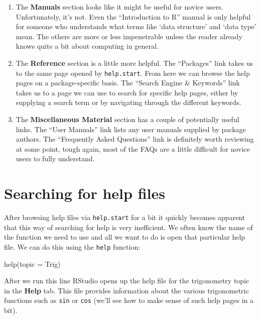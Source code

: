 \documentclass[
]{book}
\newenvironment{Shaded}{\begin{snugshade}}{\end{snugshade}}
\newcommand{\AttributeTok}[1]{\textcolor[rgb]{0.77,0.63,0.00}{#1}}
\newcommand{\FunctionTok}[1]{\textcolor[rgb]{0.00,0.00,0.00}{#1}}
\newcommand{\NormalTok}[1]{#1}
\begin{document}
\begin{enumerate}
\def\labelenumi{\arabic{enumi}.}
\item
  The \textbf{Manuals} section looks like it might be useful for novice users. Unfortunately, it's not. Even the ``Introduction to R'' manual is only helpful for someone who understands what terms like `data structure' and `data type' mean. The others are more or less impenetrable unless the reader already knows quite a bit about computing in general.
\item
  The \textbf{Reference} section is a little more helpful. The ``Packages'' link takes us to the same page opened by \texttt{help.start}. From here we can browse the help pages on a package-specific basis. The ``Search Engine \& Keywords'' link takes us to a page we can use to search for specific help pages, either by supplying a search term or by navigating through the different keywords.
\item
  The \textbf{Miscellaneous Material} section has a couple of potentially useful links. The ``User Manuals'' link lists any user manuals supplied by package authors. The ``Frequently Asked Questions'' link is definitely worth reviewing at some point, tough again, most of the FAQs are a little difficult for novice users to fully understand.
\end{enumerate}

\hypertarget{searching-for-help-files}{%
\section{Searching for help files}\label{searching-for-help-files}}

After browsing help files via \texttt{help.start} for a bit it quickly becomes apparent that this way of searching for help is very inefficient. We often know the name of the function we need to use and all we want to do is open that particular help file. We can do this using the \texttt{help} function:

\begin{Shaded}
\begin{Highlighting}[]
\FunctionTok{help}\NormalTok{(}\AttributeTok{topic =}\NormalTok{ Trig)}
\end{Highlighting}
\end{Shaded}

After we run this line RStudio opens up the help file for the trigonometry topic in the \textbf{Help} tab. This file provides information about the various trigonometric functions such as \texttt{sin} or \texttt{cos} (we'll see how to make sense of such help pages in a bit).
\end{document}
